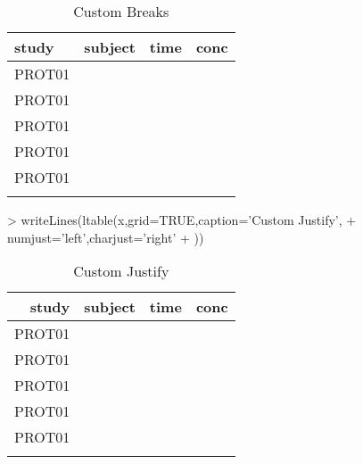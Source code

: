 \documentclass[titlepage]{article}
\begin{document}
\begin{Schunk}
\begin{table}[!htpb]
 \caption[Custom Breaks]{Custom Breaks }
 \begin{center}
  \begin{tabular}{lr||rr}
    \hline \hline
   study & subject & time & conc \\ \hline
   PROT01 & \verb#1001# & \verb#0# & \verb#0.12# \\
   PROT01 & \verb#1001# & \verb#1# & \verb#34.00# \\
   PROT01 & \verb#1001# & \verb#2# & \verb#5.60# \\ \hline
   PROT01 & \verb#1002# & \verb#0# & \verb#0.50# \\
   PROT01 & \verb#1002# & \verb#1# & \verb#200.00# \\
    & \verb#1002# & \verb#2# & \verb## \\ \hline
  \end{tabular}
 \end{center}
\end{table}\end{Schunk}
\begin{Schunk}
\begin{Sinput}
> writeLines(ltable(x,grid=TRUE,caption='Custom Justify',
+     numjust='left',charjust='right'
+ ))
\end{Sinput}
\begin{table}[!htpb]
 \caption[Custom Justify]{Custom Justify }
 \begin{center}
  \begin{tabular}{r|l|l|l}
    \hline \hline
   study & subject & time & conc \\ \hline
   PROT01 & \verb#1001# & \verb#0# & \verb#0.12# \\ \hline
   PROT01 & \verb#1001# & \verb#1# & \verb#34.00# \\ \hline
   PROT01 & \verb#1001# & \verb#2# & \verb#5.60# \\ \hline
   PROT01 & \verb#1002# & \verb#0# & \verb#0.50# \\ \hline
   PROT01 & \verb#1002# & \verb#1# & \verb#200.00# \\ \hline
    & \verb#1002# & \verb#2# & \verb## \\ \hline
  \end{tabular}
 \end{center}
\end{table}\end{Schunk}
\end{document}
